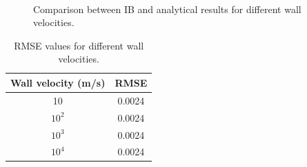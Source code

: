 \begin{figure}[H]
    \centering
    \quad
    \\
    \quad
    \caption{Comparison between IB and analytical results for different wall velocities.}
    \label{fig:C3_classicalIBResultWallVelocity}
\end{figure}

\begin{table}[H]
\centering
\begin{tabular}{c | c}
     Wall velocity (m/s) & RMSE \\ \hline \hline
     10 & 0.0024\\ \hline
     $10^2$ & 0.0024 \\ \hline
     $10^3$ & 0.0024 \\ \hline
     $10^4$ & 0.0024 \\
\end{tabular}
\caption{RMSE values for different wall velocities.}
\label{table:C3_classicalIBResultWallVelocityRMSE}
\end{table}

